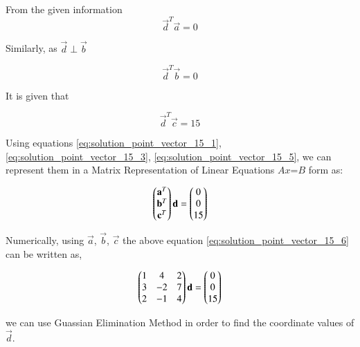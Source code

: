 From the given information	
	\begin{equation}\label{eq:solution_point_vector_15_1}
		\vec{d}^{T}\vec{a} = 0
	\end{equation} 		

	Similarly, as $\vec{d}\perp\vec{b}$
 
	\begin{equation}\label{eq:solution_point_vector_15_3}
		\vec{d}^{T}\vec{b} = 0 
	\end{equation}


	It is given that
	
	\begin{equation}\label{eq:solution_point_vector_15_5}
		\vec{d}^{T}\vec{c} = 15 
	\end{equation}

	
    Using equations \ref{eq:solution_point_vector_15_1}, \ref{eq:solution_point_vector_15_3}, \ref{eq:solution_point_vector_15_5}, we can represent them in a Matrix Representation of Linear Equations $A$$x$=$B$ form as:
 
    	\begin{align} \label{eq:solution_point_vector_15_6}
    		\begin{pmatrix}
    			\mathbf{a}^{T} \\
    			\mathbf{b}^{T} \\
    			\mathbf{c}^{T} 
    		\end{pmatrix}
    		\mathbf{d}
    		=
    		\begin{pmatrix}
    			0 \\ 0 \\ 15
    		\end{pmatrix}
    	\end{align}
    	
    
     
Numerically, using $\vec{a}$, $\vec{b}$, $\vec{c}$ the above equation \ref{eq:solution_point_vector_15_6} can be written as,

     
\begin{align}
	\begin{pmatrix}
		1 & 4 & 2 \\
		3 & -2 & 7 \\
		2 & -1 & 4 
	\end{pmatrix}
	\mathbf{d}
	=
	\begin{pmatrix}
		0 \\ 0 \\ 15
	\end{pmatrix}
\end{align}

    
    we can use Guassian Elimination Method in order to find the coordinate values of $\vec{d}$.
    
    

